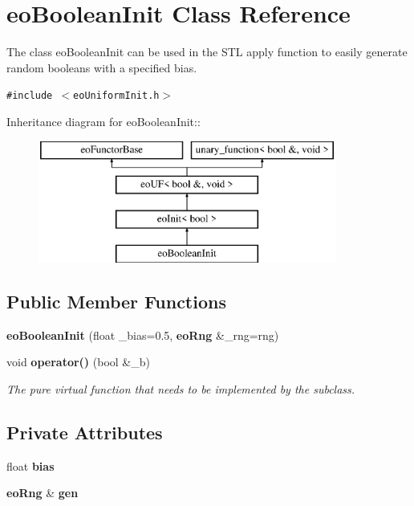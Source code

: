 \section{eo\-Boolean\-Init Class Reference}
\label{classeo_boolean_init}
The class eo\-Boolean\-Init can be used in the STL apply function to easily generate random booleans with a specified bias.  


{\tt \#include $<$eo\-Uniform\-Init.h$>$}

Inheritance diagram for eo\-Boolean\-Init::\begin{figure}[H]
\begin{center}
\leavevmode
\includegraphics[height=4cm]{classeo_boolean_init}
\end{center}
\end{figure}
\subsection*{Public Member Functions}
\begin{CompactItemize}
\item 
{\bf eo\-Boolean\-Init} (float \_\-bias=0.5, {\bf eo\-Rng} \&\_\-rng=rng)\label{classeo_boolean_init_a0}

\item 
void {\bf operator()} (bool \&\_\-b)\label{classeo_boolean_init_a1}

\begin{CompactList}\small\item\em The pure virtual function that needs to be implemented by the subclass. \item\end{CompactList}\end{CompactItemize}
\subsection*{Private Attributes}
\begin{CompactItemize}
\item 
float {\bf bias}\label{classeo_boolean_init_r0}

\item 
{\bf eo\-Rng} \& {\bf gen}\label{classeo_boolean_init_r1}

\end{CompactItemize}


